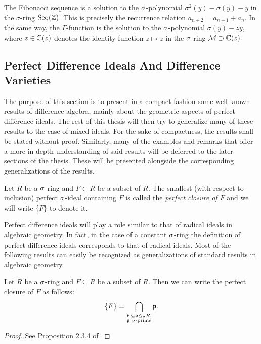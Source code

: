 \begin{ex}
The Fibonacci sequence is a solution to the $\sigma$-polynomial $\sigma^2(y) - \sigma(y) - y$ in the $\sigma$-ring  $\text{Seq}(\mathbb{Z})$. This is precisely the recurrence relation $a_{n+2} = a_{n+1} + a_n$.
In the same way, the $\Gamma$-function is the solution to the $\sigma$-polynomial $\sigma(y) - zy$, where $z \in \mathbb{C}(z)$ denotes the identity function $z \mapsto z$ in the $\sigma$-ring $\mathcal{M} \supset \mathbb{C}(z).$
\end{ex}

\subsection{Perfect Difference Ideals And Difference Varieties}

The purpose of this section is to present in a compact fashion some well-known results of difference algebra, mainly about the geometric aspects of perfect difference ideals. 
The rest of this thesis will then try to generalize many of these results to the case of mixed ideals. For the sake of compactness, the results shall be stated without proof.
Similarly, many of the examples and remarks that offer a more in-depth understanding of said results will be deferred to the later sections of the thesis. 
These will be presented alongside the corresponding generalizations of the results.

\begin{defn}
Let $R$ be a $\sigma$-ring and $F \subset R$ be a subset of $R$. The smallest (with respect to inclusion) perfect $\sigma$-ideal containing $F$ is called the \emph{perfect closure of $F$} and we will write $\{F\}$ to denote it. 
\end{defn}

Perfect difference ideals will play a role similar to that of radical ideals in algebraic geometry. In fact, in the case of a constant $\sigma$-ring the definition of perfect difference ideals corresponds to that of radical ideals. Most of the following results can easily be recognized as generalizations of standard results in algebraic geometry. 

\begin{theorem}\label{intersectionperfect}
Let $R$ be a $\sigma$-ring and $F \subseteq R$ be a subset of $R$. Then we can write the perfect closure of $F$ as follows:
\begin{equation}\label{perfectintersection} \{F\} = \bigcap_{\substack{F \subseteq \mathfrak{p} \unlhd_{\sigma} R, \\ \mathfrak{p} ~ \sigma\text{-prime}}} \mathfrak{p}. \end{equation}
\begin{proof} See Proposition 2.3.4 of \cite{levin} \end{proof}
\end{theorem}

